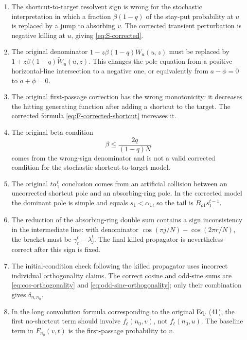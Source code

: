 \documentclass[11pt]{article}
\newcommand{\wt}{\widetilde}
\begin{document}
\begin{enumerate}
\item The shortcut-to-target resolvent sign is wrong for the stochastic interpretation in which a
fraction $\beta(1-q)$ of the stay-put probability at $u$ is replaced by a jump to absorbing $v$.
The corrected transient perturbation is negative killing at $u$, giving
\eqref{eq:S-corrected}.

\item The original denominator $1-z\beta(1-q)\wt W_u(u,z)$ must be replaced by
$1+z\beta(1-q)\wt W_u(u,z)$.  This changes the pole equation from a positive horizontal-line
intersection to a negative one, or equivalently from $a-\phi=0$ to $a+\phi=0$.

\item The original first-passage correction has the wrong monotonicity: it decreases the hitting
generating function after adding a shortcut to the target.  The corrected formula
\eqref{eq:F-corrected-shortcut} increases it.

\item The original beta condition
\begin{equation}
  \beta\leq\frac{2q}{(1-q)N}
\end{equation}
comes from the wrong-sign denominator and is not a valid corrected condition for the stochastic
shortcut-to-target model.

\item The original $t\alpha_1^t$ conclusion comes from an artificial collision between an
uncorrected shortcut pole and an absorbing-ring pole.  In the corrected model the dominant pole is
simple and equals $s_1<\alpha_1$, so the tail is $B_{\rho1}s_1^{t-1}$.

\item The reduction of the absorbing-ring double sum contains a sign inconsistency in the
intermediate line: with denominator $\cos(\pi j/N)-\cos(2\pi r/N)$, the bracket must be
$\gamma_r^t-\lambda_j^t$.  The final killed propagator is nevertheless correct after this sign is
fixed.

\item The initial-condition check following the killed propagator uses incorrect individual
orthogonality claims.  The correct cosine and odd-sine sums are \eqref{eq:cos-orthogonality} and
\eqref{eq:odd-sine-orthogonality}; only their combination gives $\delta_{n,n_0}$.

\item In the long convolution formula corresponding to the original Eq. (41), the first
no-shortcut term should involve $f_\ell(n_0,v)$, not $f_\ell(n_0,u)$.  The baseline term in
$F_{n_0}(v,t)$ is the first-passage probability to $v$.


\end{enumerate}
\end{document}
